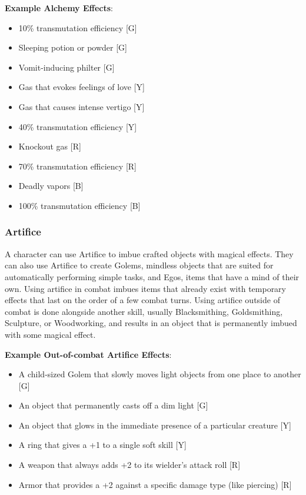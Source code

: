 \documentclass[oneside]{book}
\begin{document}
\begin{multicols}{2}
\textbf{Example Alchemy Effects}: 
	\begin{itemize}
		\setlength{\itemsep}{0cm}%
  		\setlength{\parskip}{0cm}%
		\item{ \small 10\% transmutation efficiency [G]}
		\item{ \small Sleeping potion or powder [G]}
		\item{ \small Vomit-inducing philter [G]}
		\item{ \small Gas that evokes feelings of love [Y]}
		\item{ \small Gas that causes intense vertigo [Y]}
		\item{ \small 40\% transmutation efficiency [Y]}
		\item{ \small Knockout gas [R]}
		\item{ \small 70\% transmutation efficiency [R]}
		\item{ \small Deadly vapors [B]}
		\item{ \small 100\% transmutation efficiency [B]}
	\end{itemize}

\subsubsection{Artifice}
A character can use Artifice to imbue crafted objects with magical effects. They can also use Artifice to create Golems, mindless objects that are suited for automatically performing simple tasks, and Egos, items that have a mind of their own. Using artifice in combat imbues items that already exist with temporary effects that last on the order of a few combat turns. Using artifice outside of combat is done alongside another skill, usually Blacksmithing, Goldsmithing, Sculpture, or Woodworking, and results in an object that is permanently imbued with some magical effect.

\textbf{Example Out-of-combat Artifice Effects}: 
	\begin{itemize}
		\setlength{\itemsep}{0cm}%
  		\setlength{\parskip}{0cm}%
		\item{ \small A child-sized Golem that slowly moves light objects from one place to another [G]}
		\item{ \small An object that permanently casts off a dim light [G]}
		\item{ \small An object that glows in the immediate presence of a particular creature [Y]}
		\item{ \small A ring that gives a +1 to a single soft skill [Y]}
		\item{ \small A weapon that always adds +2 to its wielder's attack roll [R]}
		\item{ \small Armor that provides a +2 against a specific damage type (like piercing) [R]}
	\end{itemize}


\end{multicols}
\end{document}
